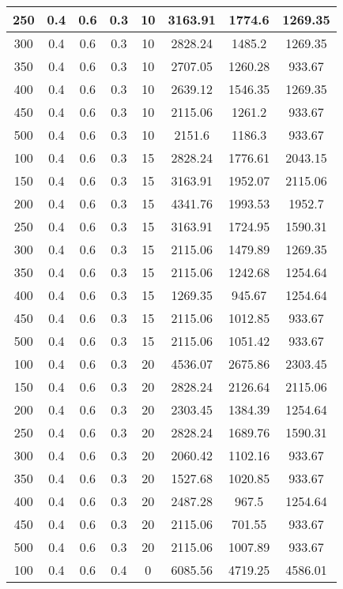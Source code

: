 \documentclass[a4paper, 12pt]{extreport}
\begin{document}
\begin{itemize}
\begin{longtable}{|c|c|c|c|c|c|c|c|}
			250 & 0.4 & 0.6 & 0.3 & 10 & 3163.91 & 1774.6 & 1269.35 \\\hline
			300 & 0.4 & 0.6 & 0.3 & 10 & 2828.24 & 1485.2 & 1269.35 \\\hline
			350 & 0.4 & 0.6 & 0.3 & 10 & 2707.05 & 1260.28 & 933.67 \\\hline
			400 & 0.4 & 0.6 & 0.3 & 10 & 2639.12 & 1546.35 & 1269.35 \\\hline
			450 & 0.4 & 0.6 & 0.3 & 10 & 2115.06 & 1261.2 & 933.67 \\\hline
			500 & 0.4 & 0.6 & 0.3 & 10 & 2151.6 & 1186.3 & 933.67 \\\hline
			100 & 0.4 & 0.6 & 0.3 & 15 & 2828.24 & 1776.61 & 2043.15 \\\hline
			150 & 0.4 & 0.6 & 0.3 & 15 & 3163.91 & 1952.07 & 2115.06 \\\hline
			200 & 0.4 & 0.6 & 0.3 & 15 & 4341.76 & 1993.53 & 1952.7 \\\hline
			250 & 0.4 & 0.6 & 0.3 & 15 & 3163.91 & 1724.95 & 1590.31 \\\hline
			300 & 0.4 & 0.6 & 0.3 & 15 & 2115.06 & 1479.89 & 1269.35 \\\hline
			350 & 0.4 & 0.6 & 0.3 & 15 & 2115.06 & 1242.68 & 1254.64 \\\hline
			400 & 0.4 & 0.6 & 0.3 & 15 & 1269.35 & 945.67 & 1254.64 \\\hline
			450 & 0.4 & 0.6 & 0.3 & 15 & 2115.06 & 1012.85 & 933.67 \\\hline
			500 & 0.4 & 0.6 & 0.3 & 15 & 2115.06 & 1051.42 & 933.67 \\\hline
			100 & 0.4 & 0.6 & 0.3 & 20 & 4536.07 & 2675.86 & 2303.45 \\\hline
			150 & 0.4 & 0.6 & 0.3 & 20 & 2828.24 & 2126.64 & 2115.06 \\\hline
			200 & 0.4 & 0.6 & 0.3 & 20 & 2303.45 & 1384.39 & 1254.64 \\\hline
			250 & 0.4 & 0.6 & 0.3 & 20 & 2828.24 & 1689.76 & 1590.31 \\\hline
			300 & 0.4 & 0.6 & 0.3 & 20 & 2060.42 & 1102.16 & 933.67 \\\hline
			350 & 0.4 & 0.6 & 0.3 & 20 & 1527.68 & 1020.85 & 933.67 \\\hline
			400 & 0.4 & 0.6 & 0.3 & 20 & 2487.28 & 967.5 & 1254.64 \\\hline
			450 & 0.4 & 0.6 & 0.3 & 20 & 2115.06 & 701.55 & 933.67 \\\hline
			500 & 0.4 & 0.6 & 0.3 & 20 & 2115.06 & 1007.89 & 933.67 \\\hline
			100 & 0.4 & 0.6 & 0.4 & 0 & 6085.56 & 4719.25 & 4586.01 \\\hline

\end{longtable}
\end{itemize}
\end{document}

